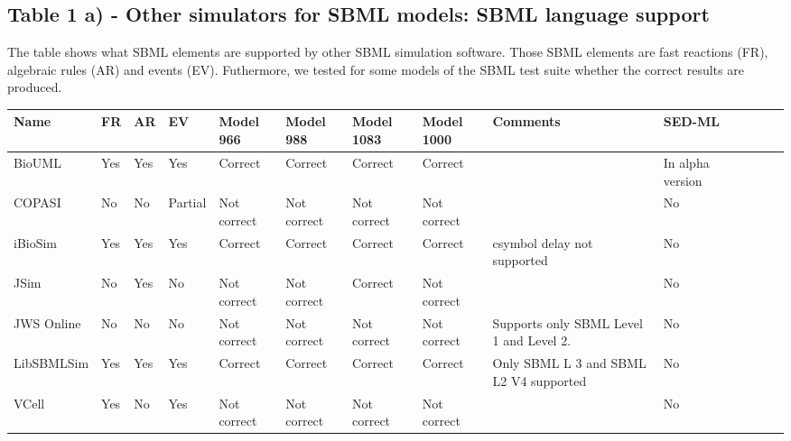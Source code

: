 \documentclass[10pt]{bmc_article}
\newenvironment{bmcformat}{\baselineskip20pt\sloppy\setboolean{publ}{false}}{\baselineskip20pt\sloppy}
\begin{document}
\begin{bmcformat}
  \subsection*{Table 1 a) - Other simulators for SBML models: SBML language support}
    The table shows what SBML elements are supported by other SBML simulation software. Those SBML elements are fast reactions (FR), algebraic rules (AR) and events (EV). Futhermore, we tested for some models of the SBML test suite whether the correct results are produced.
	\par \mbox{}
\begin{landscape}
      \begin{tabular}{|l|l|l|l|l|l|l|l|l|l|l|l|l|l|}
\hline
Name 	& FR & AR& EV &Model 966& Model 988& Model 1083 & Model 1000 &Comments & SED-ML\\\hline
BioUML & Yes& Yes& Yes& Correct & Correct & Correct & Correct&& In alpha version\\\hline
COPASI &No & No & Partial &Not correct & Not correct & Not correct& Not correct&&No\\\hline
iBioSim &Yes&Yes&Yes&Correct & Correct & Correct & Correct &csymbol delay not supported& No\\\hline
JSim & No & Yes & No & Not correct&Not correct& Correct&	Not correct && No\\\hline
JWS Online &No&No&No&Not correct&Not correct&Not correct& Not correct& Supports only SBML Level 1 and Level 2. & No \\\hline
LibSBMLSim &Yes& Yes & Yes& Correct&Correct & Correct & Correct & Only SBML L 3 and SBML L2 V4 supported & No\\\hline
VCell &Yes& No &Yes&Not correct&Not correct & Not correct & Not correct & & No\\\hline
 \end{tabular}
\end{landscape}


\end{bmcformat}
\end{document}
